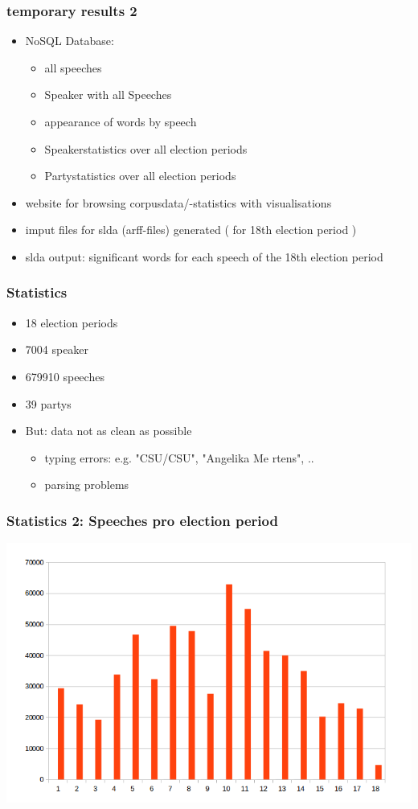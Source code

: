 \documentclass[11pt, a4paper]{beamer}
\begin{document}
\begin{frame}
\frametitle{temporary results 2}
\begin{itemize}
\item NoSQL Database:
	\begin{itemize}
		\item all speeches
		\item Speaker with all Speeches
		\item appearance of words by speech
		\item Speakerstatistics over all election periods
		\item Partystatistics over all election periods
	\end{itemize}
\item website for browsing corpusdata/-statistics with visualisations
\item imput files for slda (arff-files) generated ( for 18th election period )
\item slda output: significant words for each speech of the 18th election period 
\end{itemize}
\end{frame}

\begin{frame}
\frametitle{Statistics}
\begin{itemize}
\item 18 election periods
\item 7004 speaker
\item 679910 speeches
\item 39 partys
\item But: data not as clean as possible
\begin{itemize}
\item typing errors: e.g. "CSU/CSU", "Angelika Me rtens", ..
\item parsing problems
\end{itemize}
\end{itemize}
\end{frame}

\begin{frame}
\frametitle{Statistics 2: Speeches pro election period}
\includegraphics[scale=0.4]{speechperperiod.png}
\end{frame}
\end{document}
